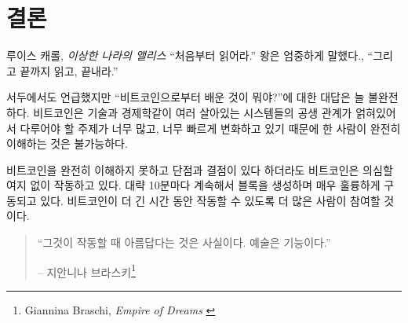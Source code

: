 \label{ch:conclusion}

\chapter*{결론}

\begin{chapquote}{루이스 캐롤, \textit{이상한 나라의 앨리스}}
\enquote{처음부터 읽어라.} 왕은 엄중하게 말했다., \enquote{그리고 끝까지 읽고, 끝내라.}
\end{chapquote}

\begin{comment}
As mentioned in the beginning, I think that any answer to the
question \textit{“What have you learned from Bitcoin?”} will always be incomplete. The
symbiosis of what can be seen as multiple living systems -- Bitcoin, the
technosphere, and economics -- is too intertwined, the topics too numerous, and
things are moving too fast to ever be fully understood by a single person.
\end{comment}
서두에서도 언급했지만 \enquote{비트코인으로부터 배운 것이 뭐야?}에 대한 대답은 
늘 불완전하다.
비트코인은 기술과 경제학같이 여러 살아있는 시스템들의 공생 관계가 얽혀있어서 다루어야 할 주제가 너무 많고, 
너무 빠르게 변화하고 있기 때문에 한 사람이 완전히 이해하는 것은 불가능하다.

\begin{comment}
Even without understanding it fully, and even with all its quirks and seeming
shortcomings, Bitcoin undoubtedly works. It keeps producing blocks roughly every
ten minutes and does so beautifully. The longer Bitcoin continues to work, the
more people will opt-in to use it.
\end{comment}
비트코인을 완전히 이해하지 못하고 단점과 결점이 있다 하더라도 
비트코인은 의심할 여지 없이 작동하고 있다.
대략 10분마다 계속해서 블록을 생성하며 매우 훌륭하게 구동되고 있다.
비트코인이 더 긴 시간 동안 작동할 수 있도록 더 많은 사람이 참여할 것이다.

\begin{quotation}\begin{samepage}
\enquote{그것이 작동할 때 아름답다는 것은 사실이다. 예술은 기능이다.}
\begin{flushright} -- 지안니나 브라스키\footnote{Giannina Braschi, \textit{Empire of Dreams} \cite{braschi2011empire}}
\end{flushright}\end{samepage}\end{quotation}

